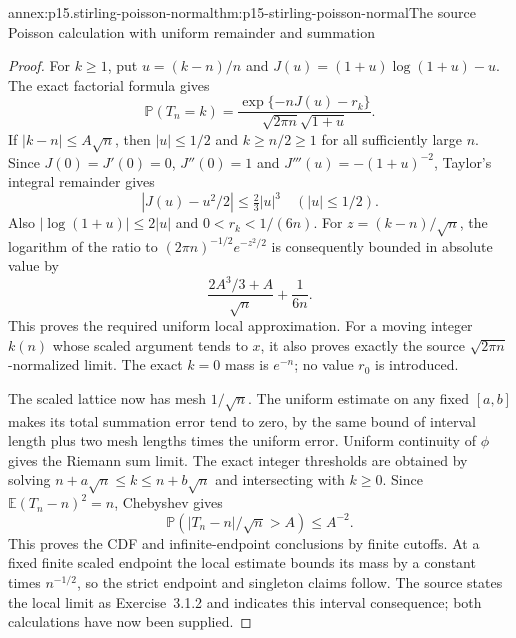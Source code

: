 \begin{annexitem}{annex:p15.stirling-poisson-normal}{thm:p15-stirling-poisson-normal}{The source Poisson calculation with uniform remainder and summation}
\begin{proof}
For \(k\geq1\), put \(u=(k-n)/n\) and
\(J(u)=(1+u)\log(1+u)-u\).
The exact factorial formula gives
\[
 \mathbb P(T_n=k)
 =\frac{\exp\{-nJ(u)-r_k\}}{\sqrt{2\pi n}\sqrt{1+u}}.
\]
If \(|k-n|\leq A\sqrt n\), then \(|u|\leq1/2\)
and \(k\geq n/2\geq1\) for all sufficiently large \(n\).
Since \(J(0)=J'(0)=0\), \(J''(0)=1\) and
\(J'''(u)=-(1+u)^{-2}\), Taylor's integral remainder gives
\[
 |J(u)-u^2/2|\leq\tfrac23|u|^3\quad(|u|\leq1/2).
\]
Also \(|\log(1+u)|\leq2|u|\) and \(0<r_k<1/(6n)\).
For \(z=(k-n)/\sqrt n\), the logarithm of the ratio to
\((2\pi n)^{-1/2}e^{-z^2/2}\) is consequently bounded
in absolute value by
\[
 \frac{2A^3/3+A}{\sqrt n}+\frac1{6n}.
\]
This proves the required uniform local approximation.
For a moving integer \(k(n)\) whose scaled argument
tends to \(x\), it also proves exactly the source
\(\sqrt{2\pi n}\)-normalized limit.
The exact \(k=0\) mass is \(e^{-n}\); no value \(r_0\)
is introduced.

The scaled lattice now has mesh \(1/\sqrt n\). The
uniform estimate on any fixed \([a,b]\) makes its total
summation error tend to zero, by the same bound of
interval length plus two mesh lengths times the uniform
error. Uniform continuity of \(\phi\) gives the Riemann
sum limit. The exact integer thresholds are obtained
by solving \(n+a\sqrt n\leq k\leq n+b\sqrt n\) and
intersecting with \(k\geq0\).
Since \(\mathbb E(T_n-n)^2=n\), Chebyshev gives
\[
 \mathbb P(|T_n-n|/\sqrt n>A)\leq A^{-2}.
\]
This proves the CDF and infinite-endpoint conclusions by
finite cutoffs. At a fixed finite scaled endpoint the
local estimate bounds its mass by a constant times
\(n^{-1/2}\), so the strict endpoint and singleton
claims follow. The source states the local limit as
Exercise~3.1.2 and indicates this interval consequence;
both calculations have now been supplied.
\end{proof}
\end{annexitem}

